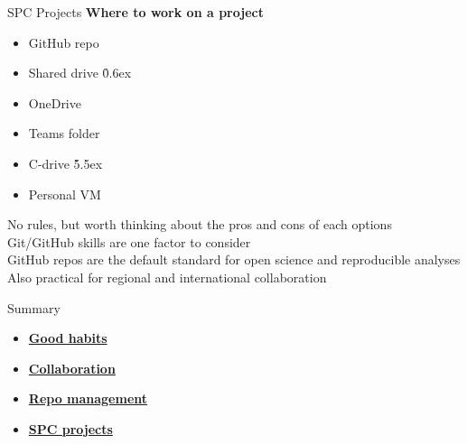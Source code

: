 \documentclass[aspectratio=169]{beamer}
\begin{document}
\begin{frame}{SPC Projects}\small
  \vspace{1ex}
  {\bf\darkgreen Where to work on a project}\\[0ex]
  \begin{itemize}
    \item[] GitHub repo\\[0ex]
    \item[] Shared drive \h{0.6ex}\\[0ex]
    \item[] OneDrive\\[0ex]
    \item[] Teams folder\\[0ex]
    \item[] C-drive \h{5.5ex}\\[0ex]
    \item[] Personal VM 
  \end{itemize}
  \vspace{2ex}
  No rules, but worth thinking about the pros and cons of each options\\[1ex]
  Git/GitHub skills are one factor to consider\\[1ex]
  GitHub repos are the default standard for open science and reproducible
  analyses\\[1ex]
  Also practical for regional and international collaboration
  \vspace{4ex}
\end{frame}


\begin{frame}{Summary}
  \begin{itemize}
    \item[] \hyperlink{habits}{\bf\darkblue Good habits}
    \\[5ex]
    \item[] \hyperlink{collaboration}{\bf\darkblue Collaboration}
    \\[5ex]
    \item[] \hyperlink{repo}{\bf\darkblue Repo management}
    \\[5ex]
    \item[] \hyperlink{spc}{\bf\darkblue SPC projects}
    \\[1ex]
  \end{itemize}
\end{frame}
\end{document}
